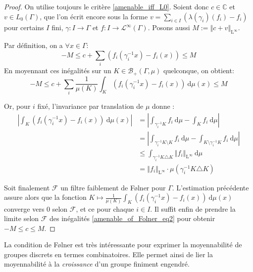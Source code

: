 \documentclass[a4paper,12pt]{article}
\newcommand{\C}{\mathbb{C}}
\newcommand{\Bor}{\mathcal{B}}
\newcommand{\norm}[1]{\left\Vert #1\right\Vert}
\newcommand{\abs}[1]{\left\vert#1\right\vert}
\newcommand{\integral}[4]{\int_{#1}^{#2} #3~\mathrm{d}#4}
\newcommand{\inv}{^{-1}}
\newcommand{\TODO}[1]{{\color{red}TODO :} #1}
\begin{document}
\begin{proof}
    On utilise toujours le critère \ref{amenable_iff_L0}. Soient donc $c\in\C$ et $v\in L_0(\Gamma)$, 
    que l'on écrit encore sous la forme $v = \sum_{i\in I} (\lambda(\gamma_i)(f_i) - f_i)$ pour certains $I$ fini, $\gamma : I \to\Gamma$ et
    $f : I\to \mathscr{L}^\infty(\Gamma)$. Posons aussi $M := \norm{c + v}_{\mathrm{L}^\infty}$.

    Par définition, on a $\forall x\in\Gamma$:
    \begin{equation}\label{amenable_of_Folner_eq1}
        -M \le c + \sum_i (f_i(\gamma_i\inv x) - f_i(x)) \le M
    \end{equation}
    En moyennant ces inégalités sur un $K\in\Bor_+(\Gamma, \mu)$ quelconque, on obtient:
    \begin{equation}\label{amenable_of_Folner_eq2}
        -M \le c + \sum_i \frac1{\mu(K)} \integral{K}{}{\left(f_i(\gamma_i\inv x) - f_i(x)\right)}{\mu(x)} \le M
    \end{equation}

    Or, pour $i$ fixé, l'invariance par translation de $\mu$ donne :
    \begin{align*}
        \abs{\integral{K}{}{(f_i(\gamma_i\inv x) - f_i(x))}{\mu(x)}} 
            &= \abs{\integral{\gamma_i\inv K}{}{f_i}{\mu} - \integral{K}{}{f_i}{\mu}} \\
            &= \abs{\integral{\gamma_i\inv K\setminus K}{}{f_i}{\mu} - \integral{K\setminus\gamma_i\inv K}{}{f_i}{\mu}} \\
            &\le \integral{\gamma_i\inv K\triangle K}{}{\norm{f_i}_{\mathrm{L}^\infty}}{\mu} \\
            &= \norm{f_i}_{\mathrm{L}^\infty} \cdot \mu(\gamma_i\inv K\triangle K)
    \end{align*}
    
    Soit finalement $\mathscr{F}$ un filtre faiblement de F\o{}lner pour $\Gamma$. L'estimation précédente assure alors que
    la fonction $K\mapsto\frac1{\mu(K)} \integral{K}{}{(f_i(\gamma_i\inv x) - f_i(x))}{\mu(x)}$ converge vers $0$
    selon $\mathscr{F}$, et ce pour chaque $i\in I$. Il suffit enfin de prendre la limite selon $\mathscr{F}$ des inégalités \ref{amenable_of_Folner_eq2}
    pour obtenir $-M\le c\le M$. 
\end{proof}

La condition de F\o{}lner est très intéressante pour exprimer la moyennabilité de groupes discrets en termes combinatoires. Elle permet ainsi 
de lier la moyennabilité à la \emph{croissance} d'un groupe finiment engendré. %
\end{document}

